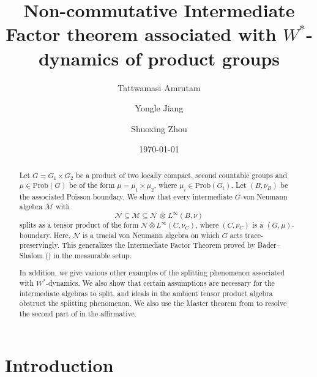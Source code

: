\documentclass[12pt]{amsart}
\newcommand{\cM}{{\mathcal M}}
\newcommand{\cN}{{\mathcal N}}
\theoremstyle{definition}
\begin{document}
\title[Intermediate Subalgebras in tensor products]{Non-commutative Intermediate Factor theorem associated with $W^*$-dynamics of product groups}
\author[Amrutam]{Tattwamasi Amrutam}
\address{Institute of Mathematics of the Polish Academy of Sciences, ul. Sniadeckich 8, 00-656, Warszawa, Poland}
\author[Jiang]{Yongle Jiang}
\address{School of Mathematical Sciences, Dalian University of Technology, Dalian, 116024, China}
\author[Zhou]{Shuoxing Zhou}\address{\'Ecole Normale Sup\'erieure\\ D\'epartement de math\'ematiques et applications\\ 45 rue d'Ulm\\ 75230 Paris Cedex 05\\ FRANCE}
\date{\today}
\begin{abstract}
Let $G = G_{1} \times G_{2}$ be a product of two locally compact, second countable groups and 
$\mu \in \mathrm{Prob}(G)$ be of the form $\mu = \mu_{1} \times \mu_{2}$, 
where $\mu_{i} \in \mathrm{Prob}(G_{i})$. Let $(B,\nu_B)$ be the associated Poisson boundary. 
We show that every intermediate $G$-von Neumann algebra $\cM$ with
\[
\cN \subseteq \mathcal{M} \subseteq \cN \,\bar{\otimes}\, L^{\infty}(B,\nu)
\]
splits as a tensor product of the form 
$\cN\bar{\otimes}L^{\infty}(C,\nu_C)$, where $(C,\nu_C)$ is a $(G,\mu)$-boundary. Here, $\cN$ is a tracial von Neumann algebra on which $G$ acts trace-preservingly. This generalizes the Intermediate Factor Theorem proved by Bader--Shalom (\cite[Theorem~1.9]{BS06}) in the measurable setup. 

In addition, we give various other examples of the splitting phenomenon associated 
with $W^{*}$-dynamics. We also show that certain assumptions are necessary for 
the intermediate algebras to split, and ideals in the ambient tensor product algebra obstruct the splitting phenomenon. We also use the Master theorem from \cite{glasner2023intermediate} to resolve the second part of \cite[Problem~5.2]{jiangskalski} in the affirmative.
\end{abstract}

\maketitle


\tableofcontents
\section{Introduction}
\end{document}
